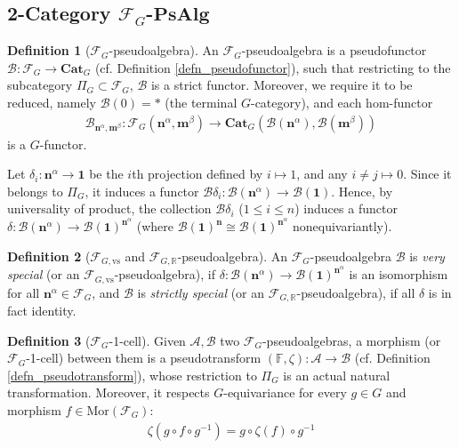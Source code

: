 \documentclass[openany, amssymb, psamsfonts]{amsart}
\theoremstyle{definition}
\newtheorem{defn}{Definition}[section]
\numberwithin{equation}{section}
\newcommand{\Cat}{\mathbf{Cat}} %
\newcommand{\PsAlg}{\mathbf{PsAlg}} %
\newcommand{\vs}{\mathrm{vs}} %
\newcommand{\F}{\mathscr{F}} %
\newcommand{\A}{\mathscr{A}}
\newcommand{\B}{\mathscr{B}}
\newcommand{\FF}{\mathbb{F}} %
\newcommand{\RR}{\mathbb{R}} %
\newcommand{\Mor}{\mathrm{Mor}} %
\begin{document}
\vspace{1pt}

\subsection{2-Category $\F_G$-$\PsAlg$}

\begin{defn}[$\F_G$-pseudoalgebra]
    An $\F_G$-pseudoalgebra is a pseudofunctor $\B:\F_G\rightarrow \Cat_G$ (cf. Definition \ref{defn_pseudofunctor}), such that restricting to the subcategory $\Pi_G\subset\F_G$, $\B$ is a strict functor. Moreover, we require it to be reduced, namely $\B(0)=*$ (the terminal $G$-category), and each hom-functor 
    \begin{align*}
        \B_{\mathbf{n}^\alpha,\mathbf{m}^\beta}:\F_G(\mathbf{n}^\alpha,\mathbf{m}^\beta)\rightarrow \Cat_G(\B(\mathbf{n}^\alpha),\B(\mathbf{m}^\beta))
    \end{align*}
    is a $G$-functor.
\end{defn}

\vspace{1pt}

Let $\delta_i:\mathbf{n}^\alpha\rightarrow\mathbf{1}$ be the $i$th projection defined by $i\mapsto 1$, and any $i\neq j\mapsto 0$. Since it belongs to $\Pi_G$, it induces a functor $\B\delta_i:\B(\mathbf{n}^\alpha)\rightarrow \B(\mathbf{1})$. Hence, by universality of product, the collection $\B\delta_i$ ($1\leq i\leq n$) induces a functor $\delta:\B(\mathbf{n}^\alpha)\rightarrow \B(\mathbf{1})^{\mathbf{n}^\alpha}$ (where $\B(\mathbf{1})^{\mathbf{n}}\cong \B(\mathbf{1})^{\mathbf{n}^{\alpha}}$ nonequivariantly).

\begin{defn}[$\F_{G,\vs}$ and $\F_{G,\RR}$-pseudoalgebra]
    An $\F_G$-pseudoalgebra $\B$ is \emph{very special} (or an $\F_{G,\vs}$-pseudoalgebra), if $\delta:\B(\mathbf{n}^\alpha)\rightarrow \B(\mathbf{1})^{\mathbf{n}^\alpha}$ is an isomorphism for all $\mathbf{n}^\alpha\in\F_G$, and $\B$ is \emph{strictly special} (or an $\F_{G,\RR}$-pseudoalgebra), if all $\delta$ is in fact identity.
\end{defn}

\vspace{1pt}

\begin{defn}[$\F_G$-1-cell]
    Given $\A,\B$ two $\F_G$-pseudoalgebras, a morphism (or $\F_G$-1-cell) between them is a pseudotransform $(\FF,\zeta):\A\rightarrow \B$ (cf. Definition \ref{defn_pseudotransform}), whose restriction to $\Pi_G$ is an actual natural transformation. Moreover, it respects $G$-equivariance for every $g\in G$ and morphism $f\in\Mor(\F_G)$:
    \begin{align*}
        \zeta(g\circ f\circ g^{-1}) = g\circ \zeta(f)\circ g^{-1}
    \end{align*}
\end{defn}
\end{document}
